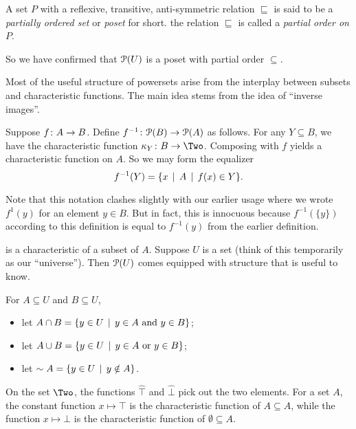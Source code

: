 \begin{defn}
	A set $P$ with a reflexive, transitive, anti-symmetric relation $\sqsubseteq$ is said to be a \emph{partially ordered set} or \emph{poset} for short. the relation $\sqsubseteq$ is called a \emph{partial order on $P$}. 
\end{defn}

So we have confirmed that ${\mathcal{P}}(U)$ is a poset with partial order $\subseteq$.

Most of the useful structure of powersets arise from the interplay between
subsets and characteristic functions. The main idea stems from the idea of ``inverse images''.

\begin{defn}
	Suppose ${f}\colon{A}\to{B}$. Define ${f^{-1}}\colon{{\mathcal{P}}(B)}\to{{\mathcal{P}}(A)}$ as follows. For any $Y\subseteq B$, we have the characteristic function $\fromto {\kappa_Y}B\Two$. 
	Composing with $f$ yields a characteristic function on $A$. So we may form the
	equalizer 
	\[ f^{-1}(Y) = \{x\,\mid\, A\,\mid\, f(x)\in Y\}.\] 
\end{defn}
Note that this notation clashes slightly with our earlier usage where we wrote $f^{1}(y)$ for an element $y\in B$. But in fact, this is innocuous because 
$f^{-1}(\{y\})$ according to this definition is equal to $f^{-1}(y)$ from the earlier definition.
	
is a characteristic of a subset of $A$. 
Suppose $U$ is a set (think of this temporarily as our ``universe''). 
Then ${\mathcal{P}}(U)$ comes equipped with structure that is useful to know.

\begin{defn}
For $A\subseteq U$ and $B\subseteq U$, 
 \begin{itemize}
 	\item let $A\cap B = \{y\in U\,\mid\, \text{$y\in A$  and $y\in B$}\}$;
 	\item let $A\cup B = \{y\in U \,\mid\, \text{$y\in A$ or $y\in B$}\}$;
 	\item let $\sim A = \{y\in U\,\mid\, y\notin A\}$.
 \end{itemize}
\end{defn}



On the set $\Two$, the functions $\hat{\top}$ and $\hat{\bot}$
pick out the two elements. For a set $A$, the constant function $x\mapsto \top$
is the characteristic function of $A\subseteq A$, while the function $x\mapsto \bot$ is the characteristic function of $\emptyset\subseteq A$. 

